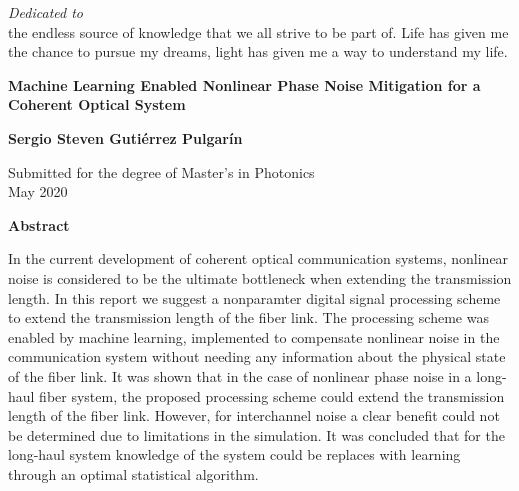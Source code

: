 \newpage
{}

\thispagestyle{empty}
\begin{center}
 \vspace*{2cm}
  \textit{\LARGE {Dedicated to}}\\ 
the endless source of knowledge that we all strive to be part of. Life has given me the chance to pursue my dreams, light has given me a way to understand my life. 



\end{center}


\newpage
\thispagestyle{empty}
\begin{center}
  \textbf{\large Machine Learning Enabled Nonlinear Phase Noise Mitigation for a Coherent Optical System}

  \vspace*{1cm}
  \textbf{\normalsize Sergio Steven Guti\'errez Pulgar\'in}

  \vspace*{0.5cm}
  {\normalsize Submitted for the degree of Master's in Photonics\\ May 2020}

  \vspace*{1cm}
  \textbf{\large Abstract}
\end{center}

\noindent In the current development of coherent optical communication systems, nonlinear noise is considered to be the ultimate bottleneck when extending the transmission length. In this report we suggest a nonparamter digital signal processing scheme to extend the transmission length of the fiber link. The processing scheme was enabled by machine learning,  implemented to compensate nonlinear noise in the communication system without needing any information about the physical state of the fiber link. It was shown that in the case of nonlinear phase noise in a long-haul fiber system, the proposed processing scheme could extend the transmission length of the fiber link. However, for interchannel noise a clear benefit could not be determined due to limitations in the simulation. It was concluded that for the long-haul system knowledge of the system could be replaces with learning through an optimal statistical algorithm. 


